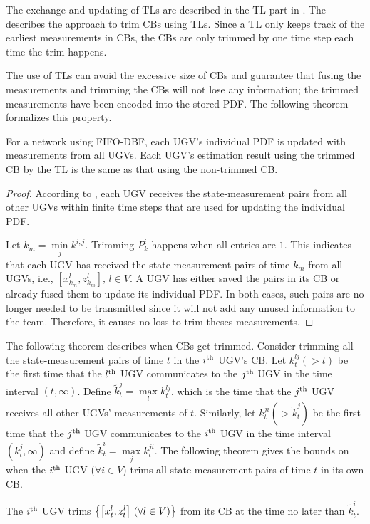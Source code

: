 	The exchange and updating of TLs are described in the TL part in .
	The  describes the approach to trim CBs using TLs.
	Since a TL only keeps track of the earliest measurements in CBs, the CBs are only trimmed by one time step each time the trim happens.	
	
	The use of TLs can avoid the excessive size of CBs and guarantee that fusing the measurements and trimming the CBs will not lose any information; the trimmed measurements have been encoded into the stored PDF.
	The following theorem formalizes this property.
	
	\begin{thm}\label{thm:trim_no_loss}
		For a {\fc} network using FIFO-DBF, each UGV's individual PDF is updated with measurements from all UGVs. 
		Each UGV's estimation result using the trimmed CB by the TL is the same as that using the non-trimmed CB.
	\end{thm}
	
	\begin{proof}
		According to , each UGV receives the state-measurement pairs from all other UGVs within finite time steps that are used for updating the individual PDF.
		
		Let $k_m=\min\limits_j k^{i,j}$. 
		Trimming $P^i_k$ happens when all entries are $1$. 
		This indicates that each UGV has received the state-measurement pairs of time $k_m$ from all UGVs, i.e., $\left[x^l_{k_m},z^l_{k_m}\right],\,l\in V$. 
		A UGV has either saved the pairs in its CB or already fused them to update its individual PDF.
		In both cases, such pairs are no longer needed to be transmitted since it will not add any unused information to the team. 
		Therefore, it causes no loss to trim theses measurements.
	\end{proof}
	
	The following theorem describes when CBs get trimmed.
	Consider trimming all the state-measurement pairs of time $t$ in the $i^\text{th}$ UGV's CB.
	Let $k^{lj}_t (>t)$ be the first time that the $l^\text{th}$ UGV communicates to the $j^\text{th}$ UGV in the time interval $(t,\infty)$.
	Define $\tilde{k}^j_t=\max\limits_l k^{lj}_t$, which is the time that the $j^\text{th}$ UGV receives all other UGVs' measurements of $t$.
	Similarly, let $k^{ji}_t (> \tilde{k}^j_t)$ be the first time that the $j^\text{th}$ UGV communicates to the $i^\text{th}$ UGV in the time interval $(k^j_t,\infty)$ and define $\tilde{k}^i_t=\max\limits_j k^{ji}_t$.
	The following theorem gives the bounds on when the $i^\text{th}$ UGV ($\forall i\in V$) trims all state-measurement pairs of time $t$ in its own CB.
	\begin{thm}\label{thm:upd_tl_freq}		
		The $i^\text{th}$ UGV trims $\left\lbrace\left[x^l_t,z^l_t\right] \,(\forall l\in V)\right\rbrace$ from its CB at the time no later than $\tilde{k}^i_t$.
	\end{thm}
	
